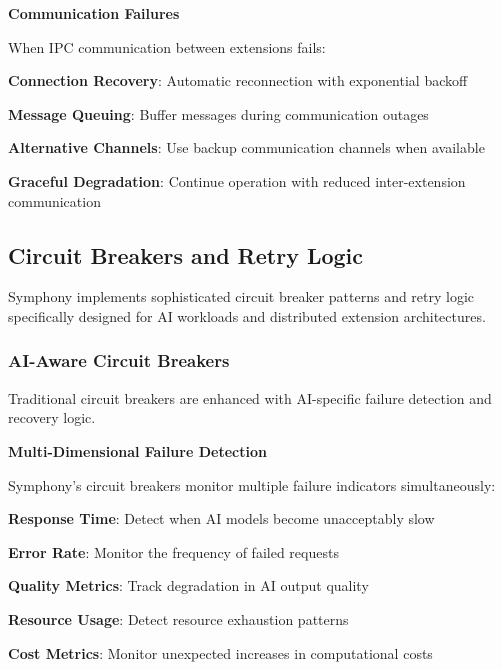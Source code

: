 \textbf{Communication Failures}

When IPC communication between extensions fails:

\begin{compactlist}
    \item \textbf{Connection Recovery}: Automatic reconnection with exponential backoff
    \item \textbf{Message Queuing}: Buffer messages during communication outages
    \item \textbf{Alternative Channels}: Use backup communication channels when available
    \item \textbf{Graceful Degradation}: Continue operation with reduced inter-extension communication
\end{compactlist}

\subsection{Circuit Breakers and Retry Logic}
\label{subsec:circuit-breakers-retry}

Symphony implements sophisticated circuit breaker patterns and retry logic specifically designed for AI workloads and distributed extension architectures.

\subsubsection{AI-Aware Circuit Breakers}

Traditional circuit breakers are enhanced with AI-specific failure detection and recovery logic.

\textbf{Multi-Dimensional Failure Detection}

Symphony's circuit breakers monitor multiple failure indicators simultaneously:

\begin{compactlist}
    \item \textbf{Response Time}: Detect when AI models become unacceptably slow
    \item \textbf{Error Rate}: Monitor the frequency of failed requests
    \item \textbf{Quality Metrics}: Track degradation in AI output quality
    \item \textbf{Resource Usage}: Detect resource exhaustion patterns
    \item \textbf{Cost Metrics}: Monitor unexpected increases in computational costs
\end{compactlist}

